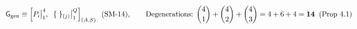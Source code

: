 \documentclass[preview]{standalone}
\begin{document}
\begin{align*}
\special{dvisvgm:raw <g id='unique000'>}\mathsf{G}_{\text{gen}} \equiv \left[ P_i\big|_1^4,\;\; \{\;\}_{(j)}\big|_1^Q \right]_{(A,S)}\;\;(\text{SM-14}), \qquad \text{Degenerations: }\binom{4}{1}+\binom{4}{2}+\binom{4}{3} = 4+6+4 = \mathbf{14}\;\;(\text{Prop 4.1})\special{dvisvgm:raw </g>}
\end{align*}
\end{document}
